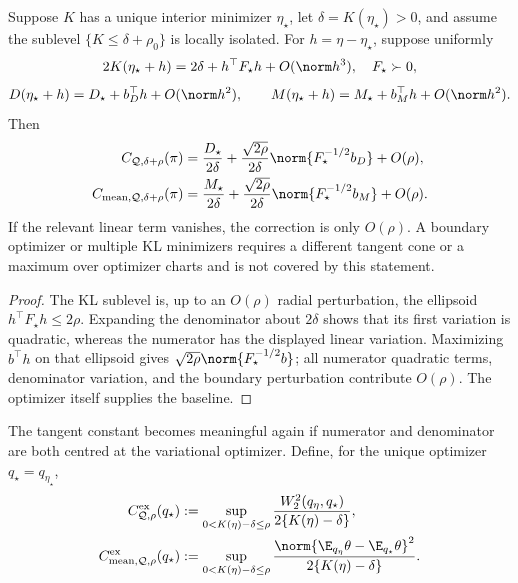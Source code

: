 \documentclass[../../main.tex]{subfiles}
\begin{document}
\begin{proposition}
\label{prop:a4-local-misspecified}
Suppose $K$ has a unique interior minimizer $\eta_\star$, let
$\delta=K(\eta_\star)>0$, and assume the sublevel $\{K\le\delta+\rho_0\}$ is locally isolated.
For $h=\eta-\eta_\star$, suppose uniformly
\[
 2K(\eta_\star+h)=2\delta+h^\top F_\star h+O(\norm h^3),
 \quad F_\star\succ0,
\]
\[
 D(\eta_\star+h)=D_\star+b_D^\top h+O(\norm h^2),\qquad
 M(\eta_\star+h)=M_\star+b_M^\top h+O(\norm h^2).
\]
Then
\begin{align}
 C_{\mathcal Q,\delta+\rho}(\pi)
 &=\frac{D_\star}{2\delta}
   +\frac{\sqrt{2\rho}}{2\delta}\norm{F_\star^{-1/2}b_D}+O(\rho),\label{eq:a4-misspec-W2}\\
 C_{\mathrm{mean},\mathcal Q,\delta+\rho}(\pi)
 &=\frac{M_\star}{2\delta}
   +\frac{\sqrt{2\rho}}{2\delta}\norm{F_\star^{-1/2}b_M}+O(\rho).
   \label{eq:a4-misspec-mean}
\end{align}
If the relevant linear term vanishes, the correction is only $O(\rho)$. A boundary optimizer or
multiple KL minimizers requires a different tangent cone or a maximum over optimizer charts and
is not covered by this statement.
\end{proposition}

\begin{proof}
The KL sublevel is, up to an $O(\rho)$ radial perturbation, the ellipsoid
$h^\top F_\star h\le2\rho$. Expanding the denominator about $2\delta$ shows that its first
variation is quadratic, whereas the numerator has the displayed linear variation. Maximizing
$b^\top h$ on that ellipsoid gives
$\sqrt{2\rho}\norm{F_\star^{-1/2}b}$; all numerator quadratic terms, denominator variation, and
the boundary perturbation contribute $O(\rho)$. The optimizer itself supplies the baseline.
\end{proof}

The tangent constant becomes meaningful again if numerator and denominator are both centred at
the variational optimizer. Define, for the unique optimizer $q_\star=q_{\eta_\star}$,
\begin{align*}
 C^{\mathrm{ex}}_{\mathcal Q,\rho}(q_\star)
 &:=\sup_{0<K(\eta)-\delta\le\rho}
 \frac{W_2^2(q_\eta,q_\star)}{2\{K(\eta)-\delta\}},\\
 C^{\mathrm{ex}}_{\mathrm{mean},\mathcal Q,\rho}(q_\star)
 &:=\sup_{0<K(\eta)-\delta\le\rho}
 \frac{\norm{\E_{q_\eta}\theta-\E_{q_\star}\theta}^2}
 {2\{K(\eta)-\delta\}}.
\end{align*}
\end{document}
